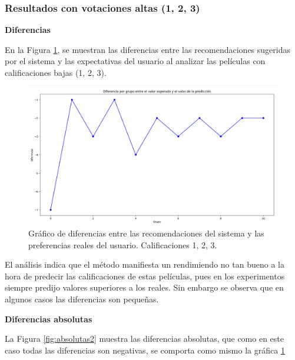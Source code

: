 \documentclass[twocolumn, fontsize=10pt]{article}
\begin{document}
\subsubsection{Resultados con votaciones altas (1, 2, 3)}

\textbf{Diferencias}

En la Figura \ref{fig:diferencias2}, se muestran las diferencias entre las recomendaciones sugeridas por el sistema y las expectativas del usuario al analizar las películas con calificaciones bajas (1, 2, 3). 

\begin{figure}[h]
    \centering
    \includegraphics[width=\columnwidth]{assets/Diferencias123.png}
    \caption{Gráfico de diferencias entre las recomendaciones del sistema y las preferencias reales del usuario. Calificaciones 1, 2, 3.}
    \label{fig:diferencias2}
\end{figure}

El análisis indica que el método manifiesta un rendimiendo no tan bueno a la hora de predecir las calificaciones de estas películas, pues en los experimentos siempre predijo valores superiores a los reales. Sin embargo se observa que en algunos casos las diferencias son pequeñas.

\textbf{Diferencias absolutas}

La Figura \ref{fig:absolutas2} muestra las diferencias absolutas, que como en este caso todas las diferencias son negativas, se comporta como mismo la gráfica \ref{fig:diferencias2}
\end{document}
